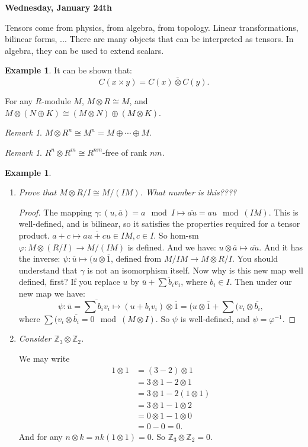 \documentclass[12pt]{amsbook}
\theoremstyle{plain}
\numberwithin{section}{chapter}
\numberwithin{equation}{chapter}
\theoremstyle{definition}
\newtheorem{Ex}[theorem]{Example}
\theoremstyle{remark}
\newtheorem{rem}[theorem]{Remark}
\newcommand{\z}{\mathbb{Z}}
\newcommand{\bee}{\begin{equation}\begin{aligned}}
\newcommand{\eee}{\end{aligned}\end{equation}}
\newcommand{\tens}{\otimes}
\renewcommand{\bar}{\overline}%
\renewcommand{\phi}{\varphi}
\begin{document}
\textbf{Wednesday, January 24th}

Tensors come from physics, from algebra, from topology. Linear transformations, bilinear forms, ... There are many objects that can be interpreted as tensors. In algebra, they can be used to extend scalars. 

\begin{Ex}
It can be shown that:
$$
C(x \times y) = \bar{C(x) \tens C(y)}.
$$
\end{Ex}

For any $R$-module $M$, $M \tens R \cong M$, and $M \tens(N \oplus K) \cong (M \tens N) \oplus (M \tens K)$. 

\begin{rem}
$M \tens R^n \cong M^n = M \oplus \cdots \oplus M$. 
\end{rem}

\begin{rem}
$R^n \tens R^m \cong R^{nm}$-free of rank $nm$. 
\end{rem}

\begin{Ex}
\vspace{5mm}
\begin{enumerate}


\item \textit{Prove that $M \tens R/I \cong M/(IM)$. What number is this????}
\begin{proof}
The mapping $\gamma:(u,\bar{a}) = a \mod I \mapsto \bar{au} = au \mod (IM)$. This is well-defined, and is bilinear, so it satisfies the properties required for a tensor product. $a + c \mapsto \bar{au + cu} \in IM, c \in I$. So hom-sm $\phi:M \tens (R/I) \to M/(IM)$ is defined. And we have: $u \tens \bar{a} \mapsto \bar{au}$. And it has the inverse: $\psi:\bar{u} \mapsto (u \tens \bar{1}$, defined from $M/IM \to M \tens R/I$. You should understand that $\gamma$ is not an isomorphism itself. Now why is this new map well defined, first? If you replace $u$ by $\bar{u }+ \bar{\sum b_iv_i}$, where $b_i \in I$. Then under our new map we have:
$$
\psi:\bar{u} = \bar{\sum b_iv_i} \mapsto (u + b_iv_i) \tens \bar{1} = (u \tens \bar{1} + \sum(v_i \tens \bar{b_i},
$$
where $\sum(v_i \tens \bar{b_i} = 0 \mod (M \tens I)$. So $\psi$ is well-defined, and $\psi = \phi^{-1}$. 
\end{proof}

\item \textit{Consider $\z_3 \tens \z_2$. }

We may write 
\bee
1 \tens 1 &= (3 - 2) \tens 1 \\
&= 3 \tens 1 - 2 \tens 1\\
&= 3 \tens 1 - 2( 1 \tens 1)\\
&= 3 \tens 1 - 1 \tens 2\\
&= 0 \tens 1 - 1 \tens 0\\
&= 0 - 0 = 0.
\eee
And for any $n \tens k = nk(1 \tens 1) =0$. So $\z_3 \tens \z_2 = 0$. 
\end{enumerate}
\end{Ex}
\end{document}
